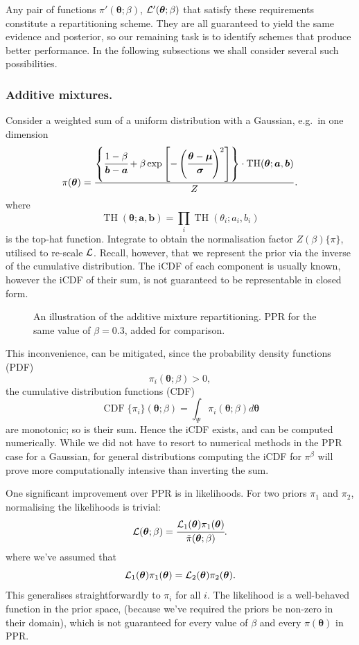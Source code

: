 \documentclass[usenatbib]{mnras}
\DeclareMathOperator{\TopHat}{TH}
\DeclareMathOperator{\CDF}{CDF}
\begin{document}
Any pair of functions \(\pi'(\bm{\theta}; \beta)\),
\({\cal L}'(\bm{\theta}; \beta)\) that satisfy these requirements
constitute a repartitioning scheme. They are all guaranteed to yield
the same evidence and posterior, so our remaining task is to identify
schemes that produce better performance. In the following subsections
we shall consider several such possibilities.

\subsubsection{Additive mixtures.}\label{sec:org418133f}
Consider a weighted sum of a uniform distribution with
a Gaussian, e.g.~in one dimension
\begin{equation}\label{eq:additive-mix}
  \pi(\bm{\theta}) = \frac{ \left\lbrace \cfrac{1- \beta} {\bm{b} - \bm{a}} + \beta \exp \left[ -\left(\cfrac{\bm{\theta} - \bm{\mu}}{\bm{\sigma}} \right)^{2}\right]\right\rbrace \cdot \TopHat(\bm{\theta}; \bm{a}, \bm{b})}{Z}.
\end{equation}
where \[\TopHat(\bm{\theta};\bm{a},\bm{b}) = \prod_{i}
	\TopHat(\theta_{i}; a_{i}, b_{i})\] is the top-hat function. Integrate
to obtain the normalisation factor \(Z(\beta)\{\pi\}\), utilised
to re-scale \({\cal L}\). Recall, however, that we represent the
prior via the inverse of the cumulative distribution. The iCDF of
each component is usually known, however the iCDF of their sum, is
not guaranteed to be representable in closed form.

\begin{figure}
  
\caption{\label{orgda3e5e9}
An illustration of the additive mixture repartitioning. PPR for the same value of \(\beta=0.3\), added for comparison.}
\end{figure}

This inconvenience, can be mitigated, since the probability
density functions (PDF) \[\pi_{i}(\bm{\theta}; \beta) >0,\] the
cumulative distribution functions (CDF)
\[\CDF\{\pi_{i}\}(\bm{\theta};\beta) = \int_{\Psi}
	\pi_{i}(\bm{\theta}; \beta)d\bm{\theta}\] are monotonic;
so is their sum. Hence the iCDF exists, and can be computed
numerically. While we did not have to resort to numerical methods
in the PPR case for a Gaussian, for general distributions
computing the iCDF for \(\pi^{\beta}\) will prove more
computationally intensive than inverting the sum.

One significant improvement over PPR is in likelihoods. For two
priors \(\pi_{1}\) and \(\pi_{2}\), normalising the likelihoods is
trivial:
\begin{equation*}
{\cal L}(\bm{\theta}; \beta) = \cfrac{{\cal L}_{1}(\bm{\theta}) \pi_{1}(\bm{\theta})}{\tilde{\pi}(\bm{\theta}; \beta)}.
\end{equation*}
where we've assumed that \[{\cal L}_{1}(\bm{\theta})\pi_{1}(\bm{\theta})
	={\cal L}_{2}(\bm{\theta}) \pi_{2}(\bm{\theta}).\] This generalises
straightforwardly to \(\pi_{i}\) for all \(i\). The likelihood is a
well-behaved function in the prior space, (because we've required
the priors be non-zero in their domain), which is not guaranteed
for every value of \(\beta\) and every \(\pi(\bm{\theta})\) in PPR.
\end{document}

